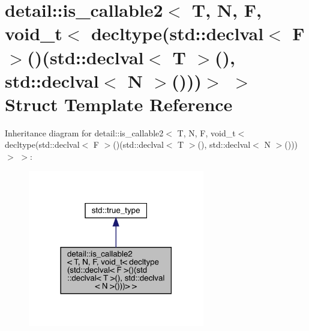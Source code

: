 \hypertarget{structdetail_1_1is__callable2_3_01_t_00_01_n_00_01_f_00_01void__t_3_01decltype_07std_1_1declval_85e36b71e7ce49c039fb03c9fdc1f60f}{}\section{detail\+:\+:is\+\_\+callable2$<$ T, N, F, void\+\_\+t$<$ decltype(std\+:\+:declval$<$ F $>$()(std\+:\+:declval$<$ T $>$(), std\+:\+:declval$<$ N $>$()))$>$ $>$ Struct Template Reference}
\label{structdetail_1_1is__callable2_3_01_t_00_01_n_00_01_f_00_01void__t_3_01decltype_07std_1_1declval_85e36b71e7ce49c039fb03c9fdc1f60f}


Inheritance diagram for detail\+:\+:is\+\_\+callable2$<$ T, N, F, void\+\_\+t$<$ decltype(std\+:\+:declval$<$ F $>$()(std\+:\+:declval$<$ T $>$(), std\+:\+:declval$<$ N $>$()))$>$ $>$\+:
\nopagebreak
\begin{figure}[H]
\begin{center}
\leavevmode
\includegraphics[width=218pt]{structdetail_1_1is__callable2_3_01_t_00_01_n_00_01_f_00_01void__t_3_01decltype_07std_1_1declval_bce1e84ae13a4d0588ceab83f672541b}
\end{center}
\end{figure}


